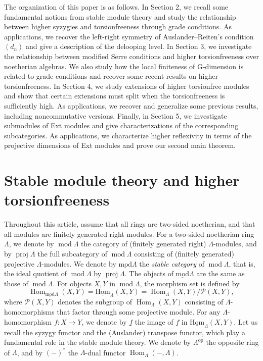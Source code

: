 \documentclass{amsart}
\theoremstyle{definition}
\theoremstyle{remark}
\numberwithin{equation}{thm}
\def\Hom{\operatorname{Hom}}
\def\lhom{\operatorname{\underline{Hom}}}
\def\lmod{\operatorname{\underline{mod}}}
\def\mod{\operatorname{mod}}
\def\proj{\operatorname{proj}}
\begin{document}
The organization of this paper is as follows. In Section 2, we recall some fundamental notions from stable module theory and study the relationship between higher syzygies and torsionfreeness through grade conditions. As applications, we recover the left-right symmetry of Auslander--Reiten's condition $(d_n)$ and give a description of the delooping level. In Section 3, we investigate the relationship between modified Serre conditions and higher torsionfreeness over noetherian algebras. We also study how the local finiteness of G-dimension is related to grade conditions and recover some recent results on higher torsionfreeness. In Section 4, we study extensions of higher torsionfree modules and show that certain extensions must split when the torsionfreeness is sufficiently high. As applications, we recover and generalize some previous results, including noncommutative versions. Finally, in Section 5, we investigate submodules of Ext modules and give characterizations of the corresponding subcategories. As applications, we characterize higher reflexivity in terms of the projective dimensions of Ext modules and prove our second main theorem.
\section{Stable module theory and higher torsionfreeness}
Throughout this article, assume that all rings are two-sided noetherian, and that all modules are finitely generated right modules.
For a two-sided noetherian ring $\Lambda$, we denote by $\mod\Lambda$ the category of (finitely generated right) $\Lambda$-modules, and by $\proj\Lambda$ the full subcategory of $\mod\Lambda$ consisting of (finitely generated) projective $\Lambda$-modules.
We denote by $\lmod\Lambda$ the {\em stable category} of $\mod\Lambda$, that is, the ideal quotient of $\mod\Lambda$ by $\proj\Lambda$.
The objects of $\lmod\Lambda$ are the same as those of $\mod\Lambda$.  
For objects $X, Y$ in $\mod\Lambda$, the morphism set is defined by
\[
\Hom_{\lmod\Lambda}(X, Y) = \lhom_\Lambda(X, Y) = \Hom_\Lambda(X, Y)/\mathscr{P}(X, Y),
\]
where $\mathscr{P}(X, Y)$ denotes the subgroup of $\Hom_\Lambda(X, Y)$ consisting of $\Lambda$-homomorphisms that factor through some projective module.  
For any $\Lambda$-homomorphism $f : X \to Y$, we denote by $\underline{f}$ the image of $f$ in $\lhom_\Lambda(X, Y)$.
Let us recall the syzygy functor and the (Auslander) transpose functor, which play a fundamental role in the stable module theory.
We denote by $\Lambda^{\mathrm{op}}$ the opposite ring of $\Lambda$, and by $(-)^\ast$ the $\Lambda$-dual functor $\Hom_\Lambda(-, \Lambda)$.
\end{document}
